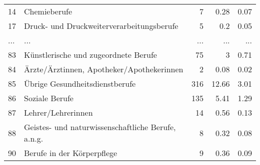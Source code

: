 \begin{longtable}{lXrrr}
        14 & \multicolumn{1}{X}{Chemieberufe} & %
          \num{7} &
          \num[round-mode=places,round-precision=2]{0,28} &
          \num[round-mode=places,round-precision=2]{0,07} \\
        17 & \multicolumn{1}{X}{Druck- und Druckweiterverarbeitungsberufe} & %
          \num{5} &
          \num[round-mode=places,round-precision=2]{0,2} &
          \num[round-mode=places,round-precision=2]{0,05} \\
       ... & ... & ... & ... & ... \\
        83 & \multicolumn{1}{X}{Künstlerische und zugeordnete Berufe} & %
          \num{75} &
          \num[round-mode=places,round-precision=2]{3} &
          \num[round-mode=places,round-precision=2]{0,71} \\

        84 & \multicolumn{1}{X}{Ärzte/Ärztinnen, Apotheker/Apothekerinnen} & %
          \num{2} &
          \num[round-mode=places,round-precision=2]{0,08} &
          \num[round-mode=places,round-precision=2]{0,02} \\

        85 & \multicolumn{1}{X}{Übrige Gesundheitsdienstberufe} & %
          \num{316} &
          \num[round-mode=places,round-precision=2]{12,66} &
          \num[round-mode=places,round-precision=2]{3,01} \\

        86 & \multicolumn{1}{X}{Soziale Berufe} & %
          \num{135} &
          \num[round-mode=places,round-precision=2]{5,41} &
          \num[round-mode=places,round-precision=2]{1,29} \\

        87 & \multicolumn{1}{X}{Lehrer/Lehrerinnen} & %
          \num{14} &
          \num[round-mode=places,round-precision=2]{0,56} &
          \num[round-mode=places,round-precision=2]{0,13} \\

        88 & \multicolumn{1}{X}{Geistes- und naturwissenschaftliche Berufe, a.n.g.} & %
          \num{8} &
          \num[round-mode=places,round-precision=2]{0,32} &
          \num[round-mode=places,round-precision=2]{0,08} \\

        90 & \multicolumn{1}{X}{Berufe in der Körperpflege} & %
          \num{9} &
          \num[round-mode=places,round-precision=2]{0,36} &
          \num[round-mode=places,round-precision=2]{0,09} \\


\end{longtable}
